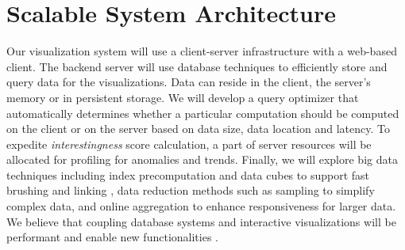 \section*{Scalable System Architecture}

Our visualization system will use a client-server infrastructure with a web-based client. The backend server will use database techniques to efficiently store and query data for the visualizations. Data can reside in the client, the server's memory or in persistent storage.  We will develop a query optimizer that automatically determines whether a particular computation should be computed on the client or on the server based on data size, data location and latency.
To expedite \textit{interestingness} score calculation, a part of server resources will be allocated for profiling for anomalies and trends.
Finally, we will explore big data techniques including index precomputation and data cubes to support fast brushing and linking \cite{liu:immens, lins:nanocubes}, data reduction methods such as sampling to simplify complex data, and online aggregation \cite{hellerstein:onlineagg, agarwal:blinkdb, fisher:trustme} to enhance responsiveness for larger data. We believe that coupling database systems and interactive visualizations will be performant and enable new functionalities \cite{wu:dvms}.